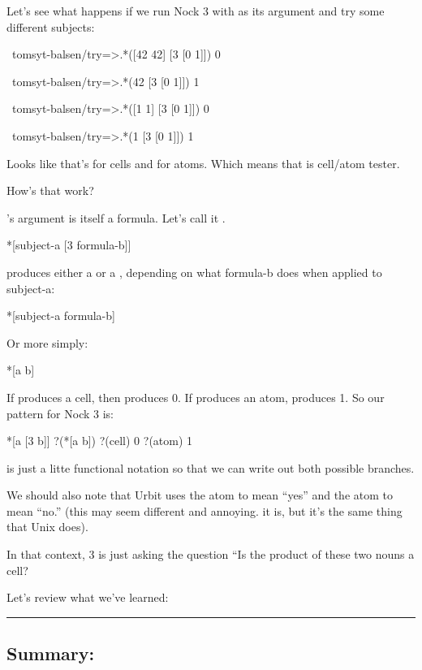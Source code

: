 Let's see what happens if we run Nock 3 with \kode{[0 1]} as its argument and try
some different subjects:
\begin{code}
~tomsyt-balsen/try=>.*([42 42] [3 [0 1]])
0

~tomsyt-balsen/try=>.*(42 [3 [0 1]])
1

~tomsyt-balsen/try=>.*([1 1] [3 [0 1]])
0

~tomsyt-balsen/try=>.*(1 [3 [0 1]])
1
\end{code}
Looks like that's  for cells and  for atoms. Which means that  is
cell/atom tester. 

How's that work?

's argument is itself a formula. Let's call it .
\begin{code}
*[subject-a [3 formula-b]]
\end{code}
 produces either a  or a , depending on what formula-b does when
applied to subject-a:
\begin{code}
*[subject-a formula-b]
\end{code}
Or more simply:
\begin{code}
*[a b]
\end{code}
If \kode{*[a b]} produces a cell, then \kode{*[a [3 b]]} produces 0. If \kode{*[a b]} produces
an atom, \kode{*[a [3 b]]} produces 1. So our pattern for Nock 3 is:
\begin{code}
*[a [3 b]]         ?(*[a b])
?(cell)            0
?(atom)            1
\end{code}
 is just a litte functional notation so that we can write out both possible branches.

We should also note that Urbit uses the atom  to mean ``yes'' and the atom 
to mean ``no.'' (this may seem different and annoying. it is, but it's
the same thing that Unix does).

In that context, 3 is just asking the question ``Is the product of these two nouns a cell?

Let's review what we've learned:

\begin{center}
\rule{3in}{0.4pt}
\end{center}

\subsection{Summary:}

